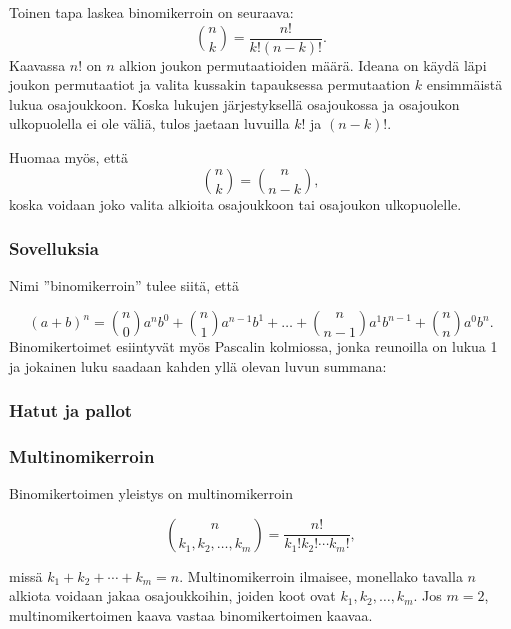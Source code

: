 Toinen tapa laskea binomikerroin on seuraava:
\[
{n \choose k}  =  \frac{n!}{k!(n-k)!}.
\]
Kaavassa $n!$ on $n$ alkion joukon permutaatioiden määrä.
Ideana on käydä läpi joukon permutaatiot
ja valita kussakin tapauksessa
permutaation $k$ ensimmäistä lukua osajoukkoon.
Koska lukujen järjestyksellä osajoukossa
ja osajoukon ulkopuolella ei ole väliä,
tulos jaetaan luvuilla $k!$ ja $(n-k)!$.

Huomaa myös, että 
\[
{n \choose k}  =  {n \choose n-k},
\]
koska voidaan joko valita alkioita
osajoukkoon tai osajoukon ulkopuolelle.

\subsubsection{Sovelluksia}

Nimi ''binomikerroin'' tulee siitä, että

\[ (a+b)^n =
{n \choose 0} a^n b^0 + 
{n \choose 1} a^{n-1} b^1 +
\ldots + 
{n \choose n-1} a^1 b^{n-1} +
{n \choose n} a^0 b^n. \]
Binomikertoimet esiintyvät myös Pascalin
kolmiossa, jonka reunoilla on lukua 1
ja jokainen luku saadaan
kahden yllä olevan luvun summana:
\begin{center}
\end{center}

\subsubsection*{Hatut ja pallot}

\subsubsection*{Multinomikerroin}

Binomikertoimen yleistys on multinomikerroin

\[ {n \choose k_1,k_2,\ldots,k_m} = \frac{n!}{k_1! k_2! \cdots k_m!}, \]

missä $k_1+k_2+\cdots+k_m=n$.
Multinomikerroin ilmaisee, monellako tavalla $n$ alkiota voidaan jakaa osajoukkoihin,
joiden koot ovat $k_1,k_2,\ldots,k_m$.
Jos $m=2$, multinomikertoimen kaava vastaa binomikertoimen kaavaa.

